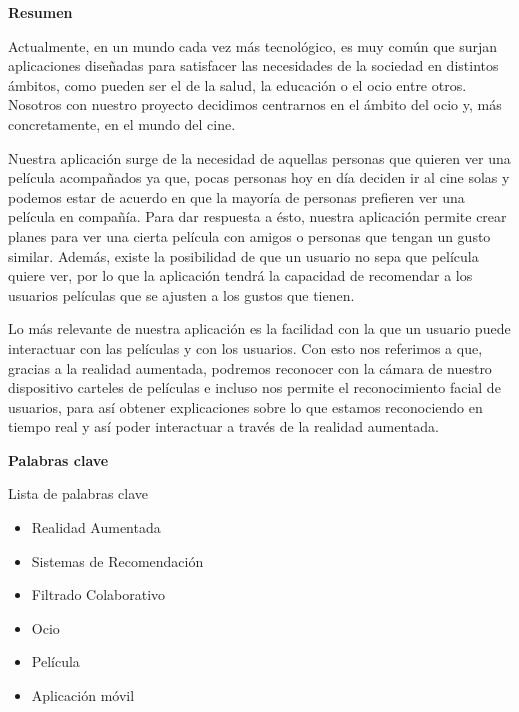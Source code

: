 
\newpage

\thispagestyle{empty}

\begin{center}

{\bf \Huge Resumen}

  \end{center}
\vspace{1cm}

Actualmente, en un mundo cada vez más tecnológico, es muy común que surjan aplicaciones diseñadas
para satisfacer las necesidades de la sociedad en distintos ámbitos, como pueden ser el de la salud, la educación o el ocio entre otros. Nosotros con nuestro proyecto decidimos centrarnos en el ámbito del ocio y, más concretamente, en el mundo del cine.

Nuestra aplicación surge de la necesidad de aquellas personas que quieren ver una película acompañados ya que, pocas personas hoy en día deciden ir al cine solas y 
podemos estar de acuerdo en que la mayoría de personas prefieren ver una película en compañía.
Para dar respuesta a ésto, nuestra aplicación permite crear planes para ver una cierta película con amigos o personas que tengan un gusto similar.
Además, existe la posibilidad de que un usuario no sepa que película quiere ver, por lo que la aplicación tendrá la capacidad
de recomendar a los usuarios películas que se ajusten a los gustos que tienen.

Lo más relevante de nuestra aplicación es la facilidad con la que un usuario puede interactuar con las películas y con los usuarios. Con esto nos referimos a que, gracias a la realidad aumentada,
podremos reconocer con la cámara de nuestro dispositivo carteles de películas e incluso nos permite el reconocimiento facial de usuarios, para así
obtener explicaciones sobre lo que estamos reconociendo en tiempo real y así poder interactuar a 
través de la realidad aumentada.
\vspace{1cm}


\begin{center}

{\bf \Large Palabras clave}

   \end{center}

   \vspace{0.5cm}
   
   Lista de palabras clave
   \begin{itemize}  
    \item Realidad Aumentada
    \item Sistemas de Recomendación
    \item Filtrado Colaborativo
    \item Ocio
    \item Película
    \item Aplicación móvil
  \end{itemize}
   


